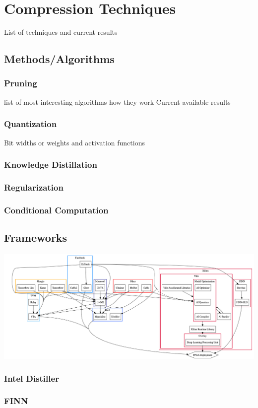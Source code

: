 \documentclass[12pt]{article}
\begin{document}
\section{Compression Techniques}
List of techniques and current results
\subsection{Methods/Algorithms}
\subsubsection{Pruning}
list of most interesting algorithms
how they work
Current available results
\subsubsection{Quantization}
Bit widths or weights and activation functions
\subsubsection{Knowledge Distillation}
\subsubsection{Regularization}
\subsubsection{Conditional Computation}

\subsection{Frameworks}
\includegraphics[width=\textwidth]{diagram.png}
\subsubsection{Intel Distiller}
\subsubsection{FINN}
\end{document}
